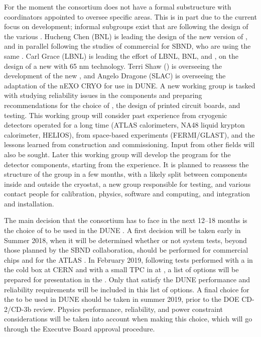 For the moment the  consortium does not have a formal substructure
with coordinators appointed to oversee specific areas. This is in part due
to the current focus on  development; informal subgroups exist that
are following the design of the various . Hucheng Chen (BNL) is leading the
design of the new version of , and in parallel following the studies
of commercial  for SBND, who are using the same . Carl Grace (LBNL) is leading the effort of
LBNL, BNL, and \fnal, on the design of a new   with 65 nm technology.
Terri Shaw (\fnal) is overseeing the development of the new  , and
Angelo Dragone (SLAC) is overseeing the adaptation of the nEXO CRYO 
for use in DUNE. A new working group is tasked with studying reliability
issues in the  components and preparing recommendations for the choice
of , the design of printed circuit boards, and testing. This working group
will consider past experience from cryogenic detectors operated for a long
time (ATLAS \lar calorimeters, NA48 liquid krypton calorimeter, HELIOS),
from space-based experiments (FERMI/GLAST), and the lessons learned from
 construction and commissioning. Input from other fields will
also be sought. Later this working group will develop the  program for the  detector
components, starting from the  experience. It is planned to
reassess the structure of the group in a few months, with a likely split
between components inside and outside the cryostat, a new group responsible
for testing, and various contact people for calibration, physics, software and
computing, and integration and installation.
 
The main decision that the consortium has to face in the next \numrange{12}{18} months
is the choice of  to be used in the DUNE . A first decision will
be taken early in Summer 2018, when it will be determined whether or not system
tests, beyond those planned by the SBND collaboration, should be performed for 
commercial  chips and for the ATLAS . In February 2019, following tests
performed with a   in the cold box at CERN and with a small TPC in
\lar at \fnal, a list of options will be prepared for presentation in the .
Only  that satisfy the DUNE performance and reliability requirements
will be included in this list of options. A final choice for the  to
be used in DUNE should be taken in summer 2019, prior to the DOE CD-2/CD-3b
review. Physics performance, reliability, and power constraint considerations
will be taken into account when making this choice, which will go through
the Executve Board approval procedure.
